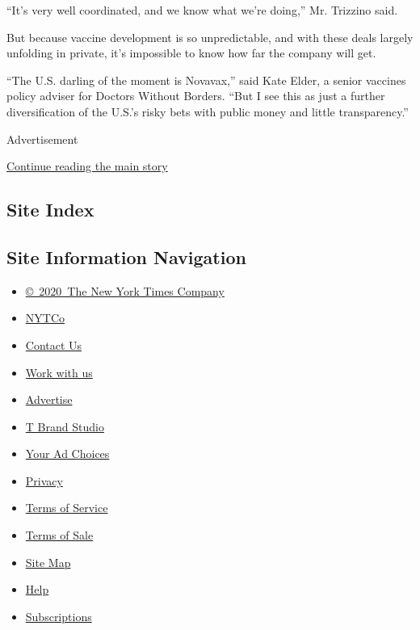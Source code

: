 ``It's very well coordinated, and we know what we're doing,'' Mr.
Trizzino said.

But because vaccine development is so unpredictable, and with these
deals largely unfolding in private, it's impossible to know how far the
company will get.

``The U.S. darling of the moment is Novavax,'' said Kate Elder, a senior
vaccines policy adviser for Doctors Without Borders. ``But I see this as
just a further diversification of the U.S.'s risky bets with public
money and little transparency.''

Advertisement

\protect\hyperlink{after-bottom}{Continue reading the main story}

\hypertarget{site-index}{%
\subsection{Site Index}\label{site-index}}

\hypertarget{site-information-navigation}{%
\subsection{Site Information
Navigation}\label{site-information-navigation}}

\begin{itemize}
\tightlist
\item
  \href{https://help.nytimes.com/hc/en-us/articles/115014792127-Copyright-notice}{©~2020~The
  New York Times Company}
\end{itemize}

\begin{itemize}
\tightlist
\item
  \href{https://www.nytco.com/}{NYTCo}
\item
  \href{https://help.nytimes.com/hc/en-us/articles/115015385887-Contact-Us}{Contact
  Us}
\item
  \href{https://www.nytco.com/careers/}{Work with us}
\item
  \href{https://nytmediakit.com/}{Advertise}
\item
  \href{http://www.tbrandstudio.com/}{T Brand Studio}
\item
  \href{https://www.nytimes.com/privacy/cookie-policy\#how-do-i-manage-trackers}{Your
  Ad Choices}
\item
  \href{https://www.nytimes.com/privacy}{Privacy}
\item
  \href{https://help.nytimes.com/hc/en-us/articles/115014893428-Terms-of-service}{Terms
  of Service}
\item
  \href{https://help.nytimes.com/hc/en-us/articles/115014893968-Terms-of-sale}{Terms
  of Sale}
\item
  \href{https://spiderbites.nytimes.com}{Site Map}
\item
  \href{https://help.nytimes.com/hc/en-us}{Help}
\item
  \href{https://www.nytimes.com/subscription?campaignId=37WXW}{Subscriptions}
\end{itemize}

